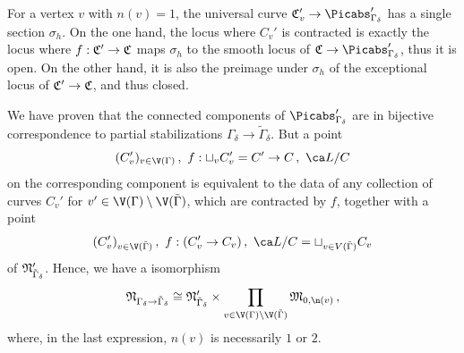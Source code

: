 
For a vertex $v$ with $n(v)=1$, the universal curve $\frak C_v' \to \Picabs'_{\Gamma_{\delta}}$ has a single section $\sigma_h$. On the one hand, the locus where $C_v'$ is contracted is exactly the locus where $f : \frak C' \to \frak C$ maps $\sigma_h$ to the smooth locus of $\frak C \to \Picabs'_{\Gamma_{\delta}}$, thus it is open. On the other hand, it is also the preimage under $\sigma_h$ of the exceptional locus of $\frak C' \to \frak C$, and thus closed.

We have proven that the connected components of $\Picabs'_{\Gamma_{\delta}}$ are in bijective correspondence to partial stabilizations $\Gamma_{\delta}\to\tilde{\Gamma}_{\delta}$. But a point
\[(C_v')_{v \in \V(\Gamma)}\, , \,\, f: \sqcup_v C_v' = C' \to C\, , \,\, \ca L/C\]
on the corresponding component is equivalent to the data of any collection of curves $C_v'$ for $v' \in \V(\Gamma) \setminus \V(\tilde \Gamma)$, which are contracted by $f$, together with a point
\[(C_v')_{v \in \V(\tilde \Gamma)}\, , \,\, f: (C_v' \to C_v)\, , \,\, \ca L/C = \sqcup_{v \in V(\tilde \Gamma)} C_v\]
of $\frak N'_{\Tilde{\Gamma}_{\delta}}$. Hence, we have a isomorphism
\[\frak N_{\Gamma_{\delta}\to \tilde{\Gamma}_{\delta}} \cong \frak N'_{\Tilde{\Gamma}_{\delta}}\times \prod_{v\in \V(\Gamma)\setminus \V(\Tilde{\Gamma})} \frak M_{0,\n(v)}\, ,\]
where, in the last expression, $n(v)$ is necessarily $1$ or $2$.



